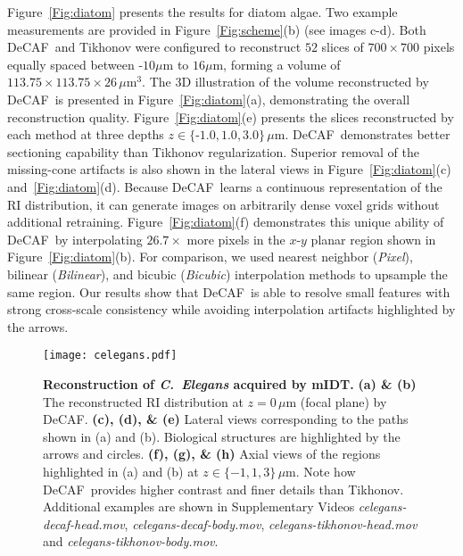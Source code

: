 \documentclass[11pt]{article}
\theoremstyle{plain} %
\def\proposed{DeCAF}
\begin{document}
Figure~\ref{Fig:diatom} presents the results for diatom algae. Two example measurements  are provided in Figure~\ref{Fig:scheme}(b) (see images c-d).
Both \proposed~and Tikhonov were configured to reconstruct $52$ slices of $700\times700$ pixels equally spaced between -$10\mu$m to $16\mu$m, forming a volume of $113.75\times113.75\times26\,\mu$m$^3$. 
The 3D illustration of the volume reconstructed by \proposed~is presented in Figure~\ref{Fig:diatom}(a), demonstrating the overall reconstruction quality.
Figure~\ref{Fig:diatom}(e) presents the slices reconstructed by each method at three depths $z\in\{\text{-}1.0,1.0,3.0\}\,\mu$m.
\proposed~demonstrates better sectioning capability than Tikhonov regularization. 
Superior removal of the missing-cone artifacts is also shown in the lateral views in Figure~\ref{Fig:diatom}(c) and~\ref{Fig:diatom}(d).
Because \proposed~learns a continuous representation of the RI distribution, it can generate images on arbitrarily dense voxel grids without additional retraining. Figure~\ref{Fig:diatom}(f) demonstrates this unique ability of \proposed~by interpolating $26.7\times$ more pixels in the $x$-$y$ planar region shown in Figure~\ref{Fig:diatom}(b).
For comparison, we used nearest neighbor (\emph{Pixel}), bilinear (\emph{Bilinear}), and bicubic (\emph{Bicubic}) interpolation methods to upsample the same region.
Our results show that \proposed~is able to resolve small features with strong cross-scale consistency while avoiding interpolation artifacts highlighted by the arrows.

\begin{figure}[t!]
\begin{center}
\texttt{[image: celegans.pdf]}
\end{center}
\caption{
\textbf{Reconstruction of \emph{C.\ Elegans} acquired by mIDT.}
\textbf{(a) \& (b)} The reconstructed RI distribution at $z=0\,\mu$m (focal plane) by \proposed.
\textbf{(c), (d), \& (e)} Lateral views corresponding to the paths shown in (a) and (b). Biological structures are highlighted by the arrows and circles.
\textbf{(f), (g), \& (h)} Axial views of the regions highlighted in (a) and (b) at $z\in\{-1,1,3\}\,\mu$m. Note how \proposed~provides higher contrast and finer details than Tikhonov.
Additional examples are shown in Supplementary Videos \emph{celegans-decaf-head.mov}, \emph{celegans-decaf-body.mov}, \emph{celegans-tikhonov-head.mov} and \emph{celegans-tikhonov-body.mov}.
}
\label{Fig:celegans}
\end{figure}
\end{document}
